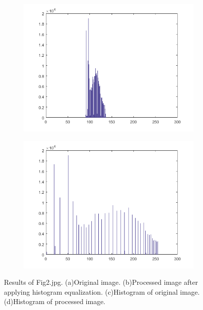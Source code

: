 \begin{figure}[h!]
\begin{subfigure}[b]{0.45\linewidth}
		\caption{}
		\label{fig:g2}
	\end{subfigure}
	\begin{subfigure}[b]{0.45\linewidth}
    	\includegraphics[width=\linewidth]{myfigure/p1/fbar2.png}
    	\caption{}
    	\label{fig:fbar2}
  	\end{subfigure}
	\begin{subfigure}[b]{0.45\linewidth}
    	\includegraphics[width=\linewidth]{myfigure/p1/gbar2.png}
    	\caption{}
    	\label{fig:gbar2}
  	\end{subfigure}
  	\caption{Results of Fig2.jpg. (a)Original image. (b)Processed image after applying histogram equalization. (c)Histogram of original image. (d)Histogram of processed image.}
  	\label{fig:result2}
\end{figure}

